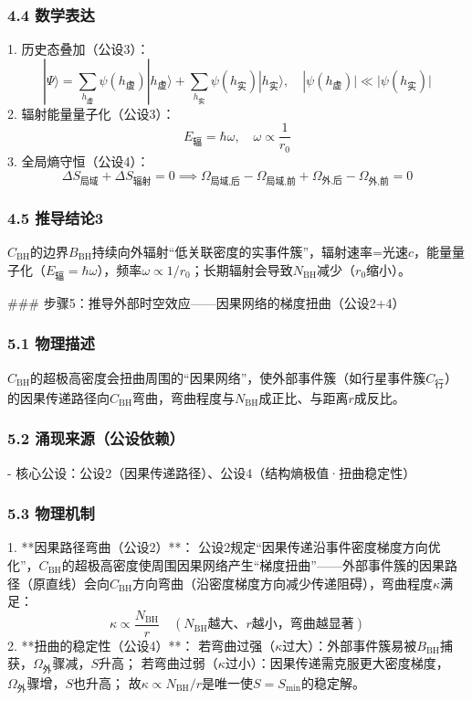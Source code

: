\documentclass{article}
\begin{document}
\subsubsection{4.4 数学表达}
1. 历史态叠加（公设3）：  
   \[
   |\Psi\rangle = \sum_{h_{\text{虚}}} \psi(h_{\text{虚}})|h_{\text{虚}}\rangle + \sum_{h_{\text{实}}} \psi(h_{\text{实}})|h_{\text{实}}\rangle, \quad |\psi(h_{\text{虚}})| \ll |\psi(h_{\text{实}})|
   \]
2. 辐射能量量子化（公设3）：  
   \[
   E_{\text{辐}} = \hbar \omega, \quad \omega \propto \frac{1}{r_0}
   \]
3. 全局熵守恒（公设4）：  
   \[
   \Delta S_{\text{局域}} + \Delta S_{\text{辐射}} = 0 \implies \Omega_{\text{局域,后}} - \Omega_{\text{局域,前}} + \Omega_{\text{外,后}} - \Omega_{\text{外,前}} = 0
   \]

\subsubsection{4.5 推导结论3}
\(C_{\text{BH}}\)的边界\(B_{\text{BH}}\)持续向外辐射“低关联密度的实事件簇”，辐射速率=光速\(c\)，能量量子化（\(E_{\text{辐}} = \hbar \omega\)），频率\(\omega \propto 1/r_0\)；长期辐射会导致\(N_{\text{BH}}\)减少（\(r_0\)缩小）。


### 步骤5：推导外部时空效应——因果网络的梯度扭曲（公设2+4）
\subsubsection{5.1 物理描述}
\(C_{\text{BH}}\)的超极高密度会扭曲周围的“因果网络”，使外部事件簇（如行星事件簇\(C_{\text{行}}\)）的因果传递路径向\(C_{\text{BH}}\)弯曲，弯曲程度与\(N_{\text{BH}}\)成正比、与距离\(r\)成反比。

\subsubsection{5.2 涌现来源（公设依赖）}
- 核心公设：公设2（因果传递路径）、公设4（结构熵极值·扭曲稳定性）

\subsubsection{5.3 物理机制}
1. **因果路径弯曲（公设2）**：  
   公设2规定“因果传递沿事件密度梯度方向优化”，\(C_{\text{BH}}\)的超极高密度使周围因果网络产生“梯度扭曲”——外部事件簇的因果路径（原直线）会向\(C_{\text{BH}}\)方向弯曲（沿密度梯度方向减少传递阻碍），弯曲程度\(\kappa\)满足：  
   \[
   \kappa \propto \frac{N_{\text{BH}}}{r} \quad (N_{\text{BH}}越大、r越小，弯曲越显著)
   \]
2. **扭曲的稳定性（公设4）**：  
   若弯曲过强（\(\kappa\)过大）：外部事件簇易被\(B_{\text{BH}}\)捕获，\(\Omega_{\text{外}}\)骤减，\(S\)升高；  
   若弯曲过弱（\(\kappa\)过小）：因果传递需克服更大密度梯度，\(\Omega_{\text{外}}\)骤增，\(S\)也升高；  
   故\(\kappa \propto N_{\text{BH}}/r\)是唯一使\(S = S_{\text{min}}\)的稳定解。
\end{document}
